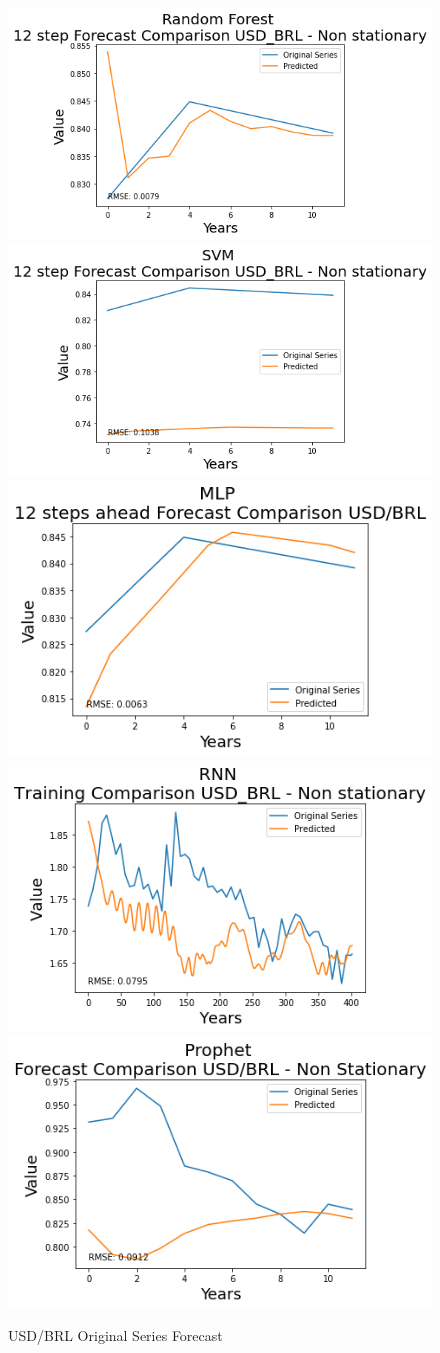\documentclass[10pt,twocolumn,letterpaper]{article}
\begin{document}
	\begin{figure}[h]
		\centering
		\includegraphics[width=0.45\linewidth]{../img/RandomForest/usd_brl_for}
		\includegraphics[width=0.45\linewidth]{../img/SVM/usd_brl_for}
		\includegraphics[width=0.45\linewidth]{../img/MLP/usd_brl_for}
		\includegraphics[width=0.45\linewidth]{../img/RNN/usd_brl_for}
		\includegraphics[width=0.45\linewidth]{../img/Prophet/usd_brl_for}
		\caption{USD/BRL Original Series Forecast}
		\label{fig:usd_brlforecast}
	\end{figure}
	
	
	
	
	
	
	
	
	
	
	
\end{document}
